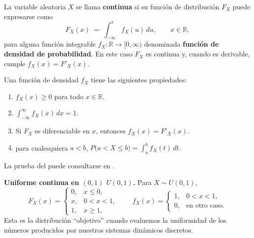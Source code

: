 \documentclass[../Main.tex]{subfiles}
\begin{document}
\begin{definition}
La variable aleatoria $X$ se llama \textbf{continua} si su función de
distribución $F_X$ puede expresarse como
\[
    F_X(x)\;=\;\int_{-\infty}^{x} f_X(u)\,du,
    \qquad x\in\mathbb R,
\]
para alguna función integrable
$f_X:\mathbb R\to[0,\infty)$
denominada \textbf{función de densidad de probabilidad}. 
En este caso $F_X$ es continua y, cuando es derivable,
cumple $f_X(x)=F'_X(x)$.
\end{definition}

\begin{lemma}Una función de densidad \(f_X\) tiene las siguientes propiedades:
\begin{enumerate}
    \item \(f_X(x)\ge 0\) para todo \(x\in\mathbb R\).
    \item \(\displaystyle \int_{-\infty}^{\infty} f_X(x)\,dx = 1\).
    \item Si \(F_X\) es diferenciable en \(x\), entonces
          \(f_X(x)=F'_X(x)\).
    \item para cualesquiera $a<b$,
\(
    P\bigl(a<X\le b\bigr)=\int_{a}^{b} f_X(t)\,dt.
\)
\end{enumerate}
\label{lemma:dens}
\end{lemma}
La prueba del  puede consultarse en \cite{grimmett2001probability}.


\begin{example}
 \textbf{Uniforme continua en \((0,1)\) \(U(0,1)\).}  
          Para \(X\sim U(0,1)\),
          \[
              F_X(x)=
              \begin{cases}
                  0, & x\le 0,\\[4pt]
                  x, & 0<x<1,\\[4pt]
                  1, & x\ge 1,
              \end{cases}
              \qquad
              f_X(x)=
              \begin{cases}
                  1, & 0<x<1,\\[4pt]
                  0, & \text{en otro caso.}
              \end{cases}
          \]
          Esta es la distribución “objetivo” cuando evaluemos la uniformidad
          de los números producidos por nuestros sistemas dinámicos discretos.
\end{example}
\end{document}
